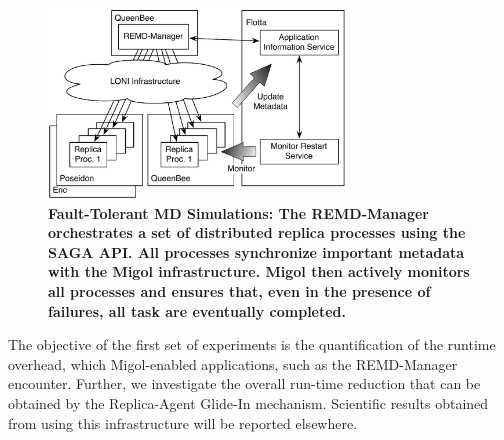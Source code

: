 \documentclass{rspublic}
\newcommand{\glidein}[1]{Glide-In }
\newcommand{\replicaagent}[1]{Replica-Agent }
\begin{document}
\begin{figure}[t]
    \centering
        \includegraphics[width=0.7\textwidth]{saga-taskfarming}
        \caption{\footnotesize \bf Fault-Tolerant MD Simulations: The
          REMD-Manager orchestrates a set of distributed replica
          processes using the SAGA API. All processes synchronize
          important metadata with the Migol infrastructure. Migol then
          actively monitors all processes and ensures that, even in
          the presence of failures, all task are eventually
          completed.}
    \label{fig:saga-taskfarming}
\end{figure} 
The objective of the first set of experiments is the
quantification of the runtime overhead, which Migol-enabled
applications, such as the REMD-Manager encounter.  Further, we investigate the 
overall run-time reduction that can be obtained by the \replicaagent\ \glidein\
mechanism. Scientific results obtained from using this infrastructure will be reported elsewhere.
    
\end{document}
